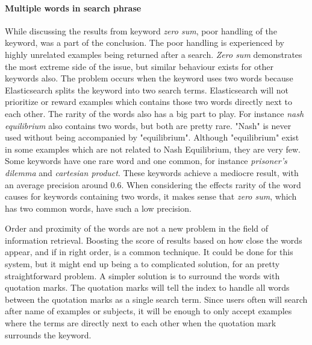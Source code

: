\paragraph{Multiple words in search phrase}
While discussing the results from keyword \textit{zero sum}, poor handling of the keyword, was a part of the conclusion. The poor handling is experienced by highly unrelated examples being returned after a search. \textit{Zero sum} demonstrates the most extreme side of the issue, but similar behaviour exists for other keywords also. The problem occurs when the keyword uses two words because Elasticsearch splits the keyword into two search terms. Elasticsearch will not prioritize or reward examples which contains those two words directly next to each other. The rarity of the words also has a big part to play. For instance \textit{nash equilibrium} also contains two words, but both are pretty rare. "Nash" is never used without being accompanied by "equilibrium". Although "equilibrium" exist in some examples which are not related to Nash Equilibrium, they are very few. Some keywords have one rare word and one common, for instance \textit{prisoner's dilemma} and \textit{cartesian product}. These keywords achieve a mediocre result, with an average precision around 0.6. When considering the effects rarity of the word causes for keywords containing two words, it makes sense that \textit{zero sum}, which has two common words, have such a low precision. 

Order and proximity of the words are not a new problem in the field of information retrieval. Boosting the score of results based on how close the words appear, and if in right order, is a common technique. It could be done for this system, but it might end up being a to complicated solution, for an pretty straightforward problem. A simpler solution is to surround the words with quotation marks. The quotation marks will tell the index to handle all words between the quotation marks as a single search term. Since users often will search after name of examples or subjects, it will be enough to only accept examples where the terms are directly next to each other when the quotation mark surrounds the keyword.


